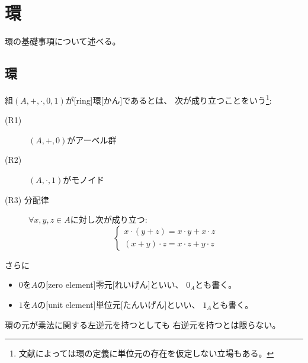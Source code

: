 \documentclass[report]{jlreq}
\begin{document}
%
\chapter{環}

環の基礎事項について述べる。

%
\section{環}

\begin{definition}[環]
    組$(A, +, \cdot, 0, 1)$が[ring]{環}[かん]であるとは、
    次が成り立つことをいう\footnote{
        文献によっては環の定義に単位元の存在を仮定しない立場もある。
    }:
    \begin{description}
        \item[(R1)] $(A, +, 0)$がアーベル群
        \item[(R2)] $(A, \cdot, 1)$がモノイド
        \item[(R3) 分配律]
            $\forall x, y, z \in A$に対し次が成り立つ:
            \begin{equation}
                \begin{cases}
                    x \cdot (y + z) = x \cdot y + x \cdot z \\
                    (x + y) \cdot z = x \cdot z + y \cdot z
                \end{cases}
            \end{equation}
    \end{description}
    さらに
    \begin{itemize}
        \item $0$を$A$の[zero element]{零元}[れいげん]といい、
            $0_A$とも書く。
        \item $1$を$A$の[unit element]{単位元}[たんいげん]といい、
            $1_A$とも書く。
    \end{itemize}
\end{definition}

\begin{remark}
    環の元が乗法に関する左逆元を持つとしても
    右逆元を持つとは限らない。
\end{remark}
\end{document}
